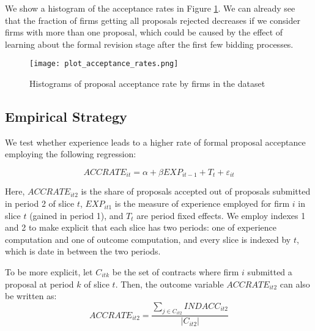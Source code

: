 We show a histogram of the acceptance rates in Figure \ref{fig:plot_acceptance_rates}. We can already see that the fraction of firms getting all proposals rejected decreases if we consider firms with more than one proposal, which could be caused by the effect of learning about the formal revision stage after the first few bidding processes.

\begin{figure}
  \texttt{[image: plot\_acceptance\_rates.png]}
  \caption{Histograms of proposal acceptance rate by firms in the dataset}
  \label{fig:plot_acceptance_rates}
\end{figure}

\subsection{Empirical Strategy}
We test whether experience leads to a higher rate of formal proposal acceptance employing the following regression:

\begin{equation}
\label{eqn:olsspec}
ACCRATE_{it}=\alpha+ \beta EXP_{it-1}+T_t+\varepsilon_{it}
\end{equation}

Here, $ACCRATE_{it2}$ is the share of proposals accepted out of proposals submitted in period 2 of slice $t$, $EXP_{it1} $ is the measure of experience employed for firm $i$ in slice $t$ (gained in period 1), and $T_t$ are period fixed effects. We employ indexes 1 and 2 to make explicit that each slice has two periods: one of experience computation and one of outcome computation, and every slice is indexed by $t$, which is date in between the two periods.

To be more explicit, let $C_{itk}$ be the set of contracts where firm $i$ submitted a proposal at period $k$ of slice $t$. Then, the outcome variable $ACCRATE_{it2}$ can also be written as:
$$  ACCRATE_{it2}=\dfrac{\sum_{j\in C_{it2}}INDACC_{it2}}{|C_{it2}|}$$


